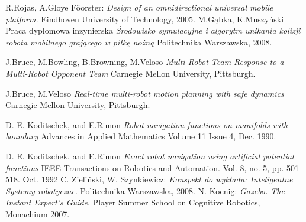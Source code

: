 \begin{thebibliography}{9}
	R.Rojas, A.Gloye F\"{o}orster:
	\emph{ Design of an omnidirectional universal mobile platform. }
	  Eindhoven University of Technology, 2005.	  
	M.Gąbka, K.Muszyński
	Praca dyplomowa inzynierska
	\emph{Środowisko symulacyjne i algorytm unikania kolizji robota mobilnego
	grającego w piłkę nożną}
	Politechnika Warszawska, 2008.

	J.Bruce, M.Bowling, B.Browning, M.Veloso
	\emph{Multi-Robot Team Response to a Multi-Robot Opponent Team}
	Carnegie Mellon University, Pittsburgh.

	J.Bruce, M.Veloso
	\emph{Real-time multi-robot motion planning with safe dynamics}
	Carnegie Mellon University, Pittsburgh.

	D. E. Koditschek, and E.Rimon 
	\emph{ Robot navigation functions on manifolds with boundary }
	Advances in Applied Mathematics
	Volume 11 Issue 4, Dec. 1990.

	D. E. Koditschek, and E.Rimon 
	\emph{Exact robot navigation using artificial potential functions }
	IEEE Transactions on Robotics and Automation.
	Vol. 8, no. 5, pp. 501-518. Oct. 1992
	C. Zieliński, W. Szynkiewicz:
	\emph{Konspekt do wykładu: Inteligentne Systemy robotyczne}.
	Politechnika Warszawska, 2008.
	N. Koenig:
	\emph{Gazebo. The Instant Expert's Guide}.
	Player Summer School on Cognitive Robotics, Monachium 2007.
\end{thebibliography}
